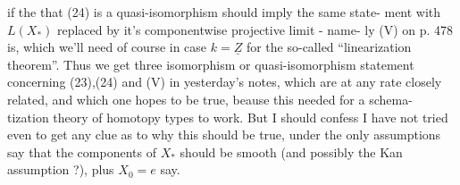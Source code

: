 
if the  that (24) is a quasi-isomorphism should imply the same state-%
ment with $L(X_*)$ replaced by it's componentwise projective limit - name-%
ly  (V) on p. 478 is, which we'll need of course in case $k=\underline{Z}$ for the
so-called ``linearization theorem''.  Thus we get three 
isomorphism or quasi-isomorphism statement concerning (23),(24) and
(V) in yesterday's notes, which are at any rate closely related, and
which  one hopes to be true, beause this  needed for a schema-%
tization theory of homotopy types to work. But I should confess I have
not tried even to get any clue as to why this should be true, under the
only assumptions say that the components of $X_*$ should be smooth (and
possibly the Kan assumption ?), plus $X_0=e$ say.

